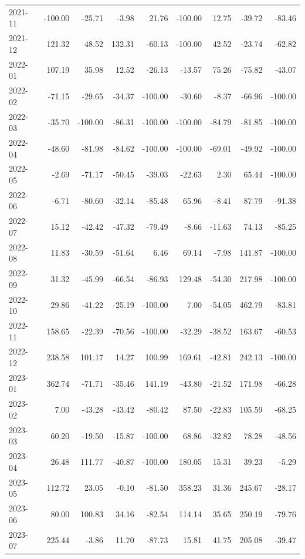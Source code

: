 \begin{table}[ht]
\begin{tabular}{lrrrrrrrr}
  2021-11 & -100.00 & -25.71 & -3.98 & 21.76 & -100.00 & 12.75 & -39.72 & -83.46 \\ 
  2021-12 & 121.32 & 48.52 & 132.31 & -60.13 & -100.00 & 42.52 & -23.74 & -62.82 \\ 
  2022-01 & 107.19 & 35.98 & 12.52 & -26.13 & -13.57 & 75.26 & -75.82 & -43.07 \\ 
  2022-02 & -71.15 & -29.65 & -34.37 & -100.00 & -30.60 & -8.37 & -66.96 & -100.00 \\ 
  2022-03 & -35.70 & -100.00 & -86.31 & -100.00 & -100.00 & -84.79 & -81.85 & -100.00 \\ 
  2022-04 & -48.60 & -81.98 & -84.62 & -100.00 & -100.00 & -69.01 & -49.92 & -100.00 \\ 
  2022-05 & -2.69 & -71.17 & -50.45 & -39.03 & -22.63 & 2.30 & 65.44 & -100.00 \\ 
  2022-06 & -6.71 & -80.60 & -32.14 & -85.48 & 65.96 & -8.41 & 87.79 & -91.38 \\ 
  2022-07 & 15.12 & -42.42 & -47.32 & -79.49 & -8.66 & -11.63 & 74.13 & -85.25 \\ 
  2022-08 & 11.83 & -30.59 & -51.64 & 6.46 & 69.14 & -7.98 & 141.87 & -100.00 \\ 
  2022-09 & 31.32 & -45.99 & -66.54 & -86.93 & 129.48 & -54.30 & 217.98 & -100.00 \\ 
  2022-10 & 29.86 & -41.22 & -25.19 & -100.00 & 7.00 & -54.05 & 462.79 & -83.81 \\ 
  2022-11 & 158.65 & -22.39 & -70.56 & -100.00 & -32.29 & -38.52 & 163.67 & -60.53 \\ 
  2022-12 & 238.58 & 101.17 & 14.27 & 100.99 & 169.61 & -42.81 & 242.13 & -100.00 \\ 
  2023-01 & 362.74 & -71.71 & -35.46 & 141.19 & -43.80 & -21.52 & 171.98 & -66.28 \\ 
  2023-02 & 7.00 & -43.28 & -43.42 & -80.42 & 87.50 & -22.83 & 105.59 & -68.25 \\ 
  2023-03 & 60.20 & -19.50 & -15.87 & -100.00 & 68.86 & -32.82 & 78.28 & -48.56 \\ 
  2023-04 & 26.48 & 111.77 & -40.87 & -100.00 & 180.05 & 15.31 & 39.23 & -5.29 \\ 
  2023-05 & 112.72 & 23.05 & -0.10 & -81.50 & 358.23 & 31.36 & 245.67 & -28.17 \\ 
  2023-06 & 80.00 & 100.83 & 34.16 & -82.54 & 114.14 & 35.65 & 250.19 & -79.76 \\ 
  2023-07 & 225.44 & -3.86 & 11.70 & -87.73 & 15.81 & 41.75 & 205.08 & -39.47 \\ 

\end{tabular}
\end{table}
